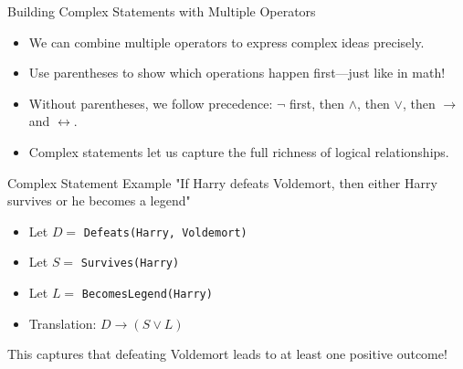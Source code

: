 \documentclass{beamer}
\begin{document}
	\begin{frame}{Building Complex Statements with Multiple Operators}
		\begin{itemize}
			\item We can combine multiple operators to express complex ideas precisely.
			\item Use parentheses to show which operations happen first—just like in math!
			\item Without parentheses, we follow precedence: $\neg$ first, then $\land$, then $\lor$, then $\rightarrow$ and $\leftrightarrow$.
			\item Complex statements let us capture the full richness of logical relationships.
		\end{itemize}
		
		\begin{alertblock}{Complex Statement Example}
			"If Harry defeats Voldemort, then either Harry survives or he becomes a legend"
			\begin{itemize}
				\scriptsize
				\item Let $D = $ \texttt{Defeats(Harry, Voldemort)}
				\item Let $S = $ \texttt{Survives(Harry)}  
				\item Let $L = $ \texttt{BecomesLegend(Harry)}
				\item Translation: $D \rightarrow (S \lor L)$
			\end{itemize}
			This captures that defeating Voldemort leads to at least one positive outcome!
		\end{alertblock}
	\end{frame}
	
\end{document}
